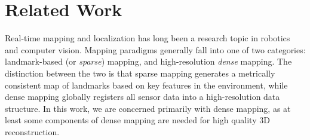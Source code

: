\section{Related Work}
Real-time mapping and localization has long been a research topic in robotics
and computer vision. Mapping paradigms generally fall into one of two
categories: landmark-based (or \emph{sparse}) mapping, and high-resolution
\emph{dense} mapping. The distinction between the two is that sparse mapping
generates a metrically consistent map of landmarks based on key features in the
environment, while dense mapping globally registers all sensor data into a
high-resolution data structure. In this work, we are concerned primarily with
dense mapping, as at least some components of dense mapping are needed for high
quality 3D reconstruction. 

